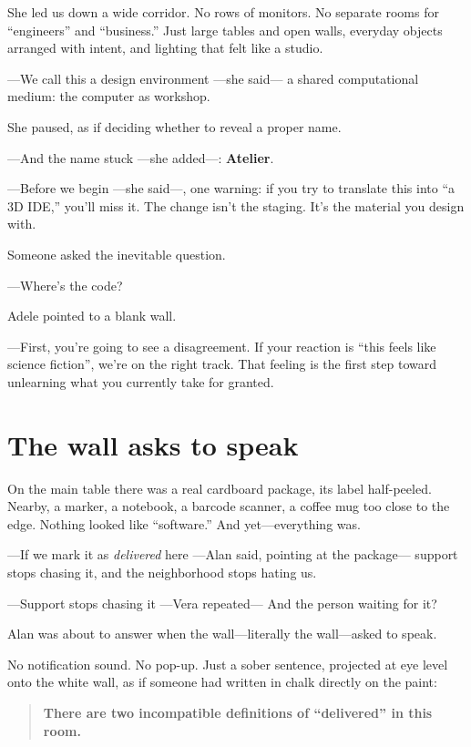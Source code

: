 \documentclass[11pt,a4paper]{article}
\begin{document}
She led us down a wide corridor. No rows of monitors. No separate rooms for
``engineers'' and ``business.'' Just large tables and open walls, everyday
objects arranged with intent, and lighting that felt like a studio.

---We call this a design environment ---she said--- a shared computational
medium: the computer as workshop.

She paused, as if deciding whether to reveal a proper name.

---And the name stuck ---she added---: \textbf{Atelier}.

---Before we begin ---she said---, one warning: if you try to translate this
into ``a 3D IDE,'' you'll miss it. The change isn't the staging. It's the
material you design with.

Someone asked the inevitable question.

---Where's the code?

Adele pointed to a blank wall.

---First, you're going to see a disagreement. If your reaction is ``this
feels like science fiction'', we're on the right track. That feeling is the
first step toward unlearning what you currently take for granted.

\section{The wall asks to speak}

On the main table there was a real cardboard package, its label half-peeled.
Nearby, a marker, a notebook, a barcode scanner, a coffee mug too close to
the edge. Nothing looked like ``software.'' And yet---everything was.

---If we mark it as \emph{delivered} here ---Alan said, pointing at the
package--- support stops chasing it, and the neighborhood stops hating us.

---Support stops chasing it ---Vera repeated--- And the person waiting for
it?

Alan was about to answer when the wall---literally the wall---asked to speak.

No notification sound. No pop-up. Just a sober sentence, projected at eye
level onto the white wall, as if someone had written in chalk directly on the
paint:

\begin{quote}
\centering
\textbf{There are two incompatible definitions of ``delivered'' in this
room.}
\end{quote}
\end{document}
